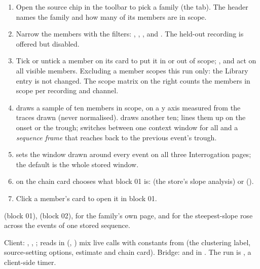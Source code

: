 
\begin{enumerate}
  \item Open the source chip in the toolbar to pick a family (the  tab). The header
        names the family and how many of its members are in scope.
  \item Narrow the members with the filters: , ,
        ,  and . The held-out recording is offered
        but disabled.
  \item Tick or untick a member on its card to put it in or out of scope; ,
         and  act on all visible members. Excluding a member scopes this run
        only: the Library entry is not changed. The scope matrix on the right counts the members
        in scope per recording and channel.
  \item {} draws a sample of ten members in scope, on a y axis measured from
        the traces drawn (never normalised).  draws another ten;  lines
        them up on the onset or the trough;  switches between one context window for
        all and a \emph{sequence frame} that reaches back to the previous event's trough.
  \item {} \textrightarrow{}  sets the window drawn around
        every event on all three Interrogation pages; the default is the whole stored window.
  \item {} on the chain card chooses what block 01 is:  (the
        store's slope analysis) or  ().
  \item Click a member's card to open it in block 01.
\end{enumerate}

 (block 01), 
(block 02),  for the family's own page, and  for the
steepest-slope rose across the events of one stored sequence.

\begin{underthehood}
Client: , ,
; reads in  (,
) mix live calls with constants from
 (the clustering label, source-setting options,
estimate and chain card). Bridge:  and
 in
. The run is , a client-side timer.
\end{underthehood}

